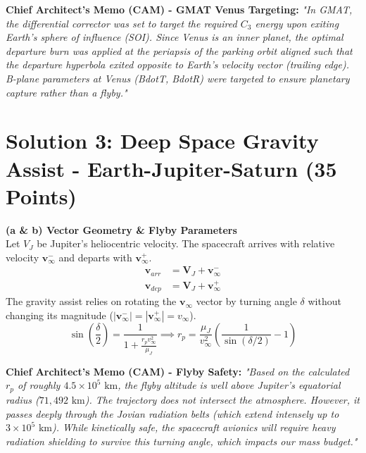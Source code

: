 \documentclass[11pt, letterpaper]{article}
\begin{document}
\textbf{Chief Architect's Memo (CAM) - GMAT Venus Targeting:}
\textit{"In GMAT, the differential corrector was set to target the required $C_3$ energy upon exiting Earth's sphere of influence (SOI). Since Venus is an inner planet, the optimal departure burn was applied at the periapsis of the parking orbit aligned such that the departure hyperbola exited opposite to Earth's velocity vector (trailing edge). B-plane parameters at Venus (BdotT, BdotR) were targeted to ensure planetary capture rather than a flyby."}

\section*{Solution 3: Deep Space Gravity Assist - Earth-Jupiter-Saturn (35 Points)}

\textbf{(a \& b) Vector Geometry \& Flyby Parameters} \\
Let $V_J$ be Jupiter's heliocentric velocity. The spacecraft arrives with relative velocity $\boldsymbol{v}_\infty^-$ and departs with $\boldsymbol{v}_\infty^+$.
\begin{align*}
    \boldsymbol{v}_{arr} &= \boldsymbol{V}_J + \boldsymbol{v}_\infty^- \\
    \boldsymbol{v}_{dep} &= \boldsymbol{V}_J + \boldsymbol{v}_\infty^+
\end{align*}
The gravity assist relies on rotating the $\boldsymbol{v}_\infty$ vector by turning angle $\delta$ without changing its magnitude ($|\boldsymbol{v}_\infty^-| = |\boldsymbol{v}_\infty^+| = v_\infty$).
\begin{equation}
    \sin\left(\frac{\delta}{2}\right) = \frac{1}{1 + \frac{r_p v_\infty^2}{\mu_J}} \implies r_p = \frac{\mu_J}{v_\infty^2} \left( \frac{1}{\sin(\delta/2)} - 1 \right)
\end{equation}

\textbf{Chief Architect's Memo (CAM) - Flyby Safety:}
\textit{"Based on the calculated $r_p$ of roughly $4.5 \times 10^5 \text{ km}$, the flyby altitude is well above Jupiter's equatorial radius ($71,492 \text{ km}$). The trajectory does not intersect the atmosphere. However, it passes deeply through the Jovian radiation belts (which extend intensely up to $3 \times 10^5 \text{ km}$). While kinetically safe, the spacecraft avionics will require heavy radiation shielding to survive this turning angle, which impacts our mass budget."}
\end{document}
